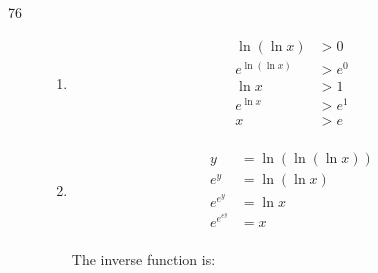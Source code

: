 \documentclass{exam}
\begin{document}
\begin{description}
\begin{enumerate}[a]
        \end{enumerate}

      \item[76]
        \begin{enumerate}[a]
          \item 
            \begin{align*}
              \ln(\ln x)     & > 0 \\
              e^{\ln(\ln x)} & > e^0 \\
              \ln x          & > 1 \\
              e^{\ln x}      & > e^1 \\
              x              & > e \\
            \end{align*}


          \item 
            \begin{align*}
              y        &= \ln(\ln(\ln x)) \\
              e^y      &= \ln(\ln x) \\
              e^{e^y}      &= \ln x \\
              e^{e^{e^y}}      &= x \\
            \end{align*}

            The inverse function is: 
        \end{enumerate}
    \end{description}
  \fi

  \ifprintanswers
    \pagebreak
  \fi
\end{document}
